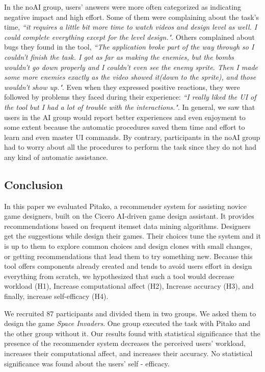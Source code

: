 \documentclass[letterpaper]{article} %
\begin{document}
In the noAI group, users' answers were more often categorized as indicating negative impact and high effort. Some of them were complaining about the task's time, \textit{``it requires a little bit more time to watch videos and design level as well. I could complete everything except for the level design."}. Others complained about bugs they found in the tool, \textit{``The application broke part of the way through so I couldn't finish the task. I got as far as making the enemies, but the bombs wouldn't go down properly and I couldn't even see the enemy sprite. Then I made some more enemies exactly as the video showed it(down to the sprite), and those wouldn't show up."}. Even when they expressed positive reactions, they were followed by problems they faced during their experience: \textit{``I really liked the UI of the tool but I had a lot of trouble with the interactions."}.  In general, we saw that users in the AI group would report better experiences and even enjoyment to some extent because the automatic procedures saved them time and effort to learn and even master UI commands. By contrary, participants in the noAI group had to worry about all the procedures to perform the task since they do not had any kind of automatic assistance. %

\subsection{Conclusion}
In this paper we evaluated Pitako, a recommender system for assisting novice game designers, built on the Cicero AI-driven game design assistant. It provides recommendations based on frequent itemset data mining algorithms. Designers get the suggestions while design their games. Their choices tune the system and it is up to them to explore common choices and design clones with small changes, or getting recommendations that lead them to try something new.
Because this tool offers components already created and tends to avoid users effort in design everything from scratch, we hypothesized that such a tool would decrease workload (H1), Increase computational affect (H2), Increase accuracy (H3), and finally, increase self-efficacy (H4).

We recruited 87 participants and divided them in two groups. We asked them to design the game \textit{Space Invaders}. One group executed the task with Pitako and the other group without it.
Our results found with statistical significance that the presence of the recommender system decreases the perceived users' workload, increases their computational affect, and increases their accuracy. No statistical significance was found about the users' self - efficacy.
\end{document}
